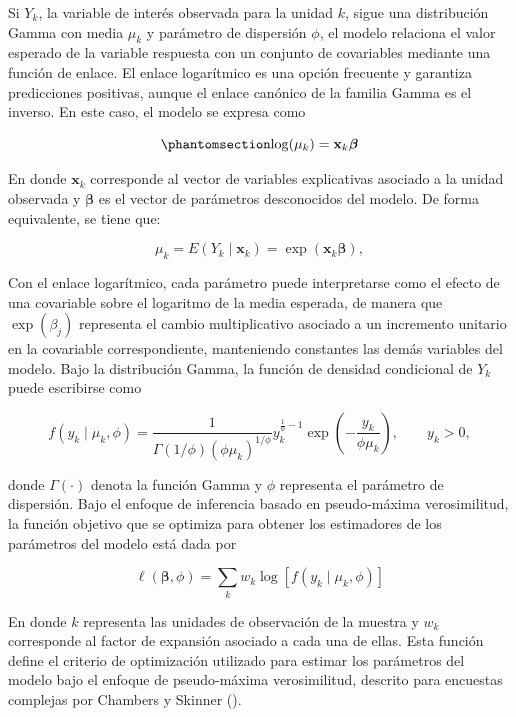 \documentclass[
  spanish,
  11pt,
  letterpaper,
  oneside,
  open=any]{scrbook}
\begin{document}
Si \(Y_{k}\), la variable de interés observada para la unidad \(k\),
sigue una distribución Gamma con media \(\mu_{k}\) y parámetro de
dispersión \(\phi\), el modelo relaciona el valor esperado de la
variable respuesta con un conjunto de covariables mediante una función
de enlace. El enlace logarítmico es una opción frecuente y garantiza
predicciones positivas, aunque el enlace canónico de la familia Gamma es
el inverso. En este caso, el modelo se expresa como

\begin{equation}\protect\phantomsection\label{eq-modelo-gamma-log}{
\log(\mu_{k})
=
\mathbf{x}_{k}\boldsymbol{\beta}
}\end{equation}

En donde \(\mathbf{x}_{k}\) corresponde al vector de variables
explicativas asociado a la unidad observada y \(\boldsymbol{\beta}\) es
el vector de parámetros desconocidos del modelo. De forma equivalente,
se tiene que:

\[
\mu_{k}
= E(Y_{k}\mid \mathbf{x}_{k})
=
\exp(\mathbf{x}_{k}\boldsymbol{\beta}),
\]

Con el enlace logarítmico, cada parámetro puede interpretarse como el
efecto de una covariable sobre el logaritmo de la media esperada, de
manera que \(\exp(\beta_j)\) representa el cambio multiplicativo
asociado a un incremento unitario en la covariable correspondiente,
manteniendo constantes las demás variables del modelo. Bajo la
distribución Gamma, la función de densidad condicional de \(Y_{k}\)
puede escribirse como

\[
f(y_{k}\mid \mu_{k},\phi)
=
\frac{1}
{\Gamma(1/\phi)
(\phi\mu_{k})^{1/\phi}}
y_{k}^{\frac{1}{\phi}-1}
\exp\left(
-\frac{y_{k}}
{\phi\mu_{k}}
\right),
\qquad y_{k}>0,
\]

donde \(\Gamma(\cdot)\) denota la función Gamma y \(\phi\) representa el
parámetro de dispersión. Bajo el enfoque de inferencia basado en
pseudo-máxima verosimilitud, la función objetivo que se optimiza para
obtener los estimadores de los parámetros del modelo está dada por

\[
\ell(\boldsymbol{\beta},\phi)
=
\sum_{k}
w_{k}
\log
\left[
f(y_{k}\mid\mu_{k},\phi)
\right]
\]

En donde \(k\) representa las unidades de observación de la muestra y
\(w_k\) corresponde al factor de expansión asociado a cada una de ellas.
Esta función define el criterio de optimización utilizado para estimar
los parámetros del modelo bajo el enfoque de pseudo-máxima
verosimilitud, descrito para encuestas complejas por Chambers y Skinner
().
\end{document}
